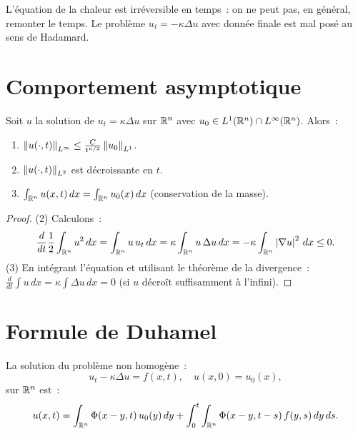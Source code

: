 \begin{attention}[title=\textbf{Irr\'eversibilit\'e}]
L'\'equation de la chaleur est irr\'eversible en temps~: on ne peut pas,
en g\'en\'eral, remonter le temps. Le probl\`eme $u_t = -\kappa\Delta u$
avec donn\'ee finale est mal pos\'e au sens de Hadamard.
\end{attention}

\section{Comportement asymptotique}

\begin{theoreme}
Soit $u$ la solution de $u_t = \kappa\Delta u$ sur $\mathbb{R}^n$ avec
$u_0 \in L^1(\mathbb{R}^n) \cap L^\infty(\mathbb{R}^n)$. Alors~:
\begin{enumerate}
    \item $\left\| u(\cdot,t) \right\|_{L^\infty} \leq \frac{C}{t^{n/2}}\left\| u_0 \right\|_{L^1}$.
    \item $\left\| u(\cdot,t) \right\|_{L^2}$ est d\'ecroissante en $t$.
    \item $\int_{\mathbb{R}^n} u(x,t)\, dx = \int_{\mathbb{R}^n} u_0(x)\, dx$ (conservation de la masse).
\end{enumerate}
\end{theoreme}

\begin{proof}
(2) Calculons~:
\[
    \frac{d}{dt}\frac{1}{2}\int_{\mathbb{R}^n} u^2\, dx
    = \int_{\mathbb{R}^n} u\, u_t\, dx
    = \kappa\int_{\mathbb{R}^n} u\, \Delta u\, dx
    = -\kappa\int_{\mathbb{R}^n} \left| \nabla u \right|^2\, dx \leq 0.
\]
(3) En int\'egrant l'\'equation et utilisant le th\'eor\`eme de la divergence~:
$\frac{d}{dt}\int u\, dx = \kappa\int \Delta u\, dx = 0$ (si $u$ d\'ecro\^it
suffisamment \`a l'infini).
\end{proof}

\section{Formule de Duhamel}

\begin{theoreme}
La solution du probl\`eme non homog\`ene~:
\[
    u_t - \kappa\Delta u = f(x,t), \quad u(x,0) = u_0(x),
\]
sur $\mathbb{R}^n$ est~:
\begin{equation}\label{eq:duhamel}
    u(x,t) = \int_{\mathbb{R}^n} \Phi(x-y,t)\, u_0(y)\, dy
    + \int_0^t \int_{\mathbb{R}^n} \Phi(x-y, t-s)\, f(y,s)\, dy\, ds.
\end{equation}
\end{theoreme}

